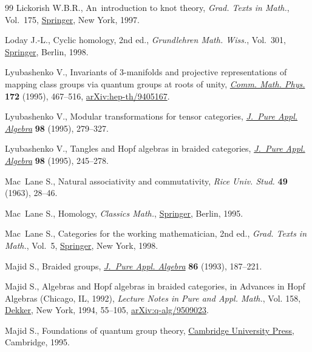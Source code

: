\documentclass[10pt,a4paper]{amsart}
\numberwithin{equation}{section}
\begin{document}
\begin{thebibliography}{99}
Lickorish W.B.R., An~introduction to knot theory, \textit{Grad. Texts in
 Math.}, Vol.~175, \href{https://doi.org/10.1007/978-1-4612-0691-0}{Springer},
 New York, 1997.

Loday J.-L., Cyclic homology, 2nd ed., \textit{Grundlehren Math. Wiss.}, Vol.~301,
 \href{https://doi.org/10.1007/978-3-662-11389-9}{Springer}, Berlin, 1998.

Lyubashenko V., Invariants of {$3$}-manifolds and projective representations of
 mapping class groups via quantum groups at roots of unity,
 \href{https://doi.org/10.1007/BF02101805}{\textit{Comm. Math. Phys.}}
 \textbf{172} (1995), 467--516,
 \href{http://arxiv.org/abs/hep-th/9405167}{arXiv:hep-th/9405167}.

Lyubashenko V., Modular transformations for tensor categories,
 \href{https://doi.org/10.1016/0022-4049(94)00045-K}{\textit{J.~Pure Appl.
 Algebra}} \textbf{98} (1995), 279--327.

Lyubashenko V., Tangles and {H}opf algebras in braided categories,
 \href{https://doi.org/10.1016/0022-4049(95)00044-W}{\textit{J.~Pure Appl.
 Algebra}} \textbf{98} (1995), 245--278.

Mac~Lane S., Natural associativity and commutativity, \textit{Rice Univ. Stud.}
 \textbf{49} (1963), 28--46.

Mac~Lane S., Homology, \textit{Classics Math.},
 \href{https://doi.org/10.1007/978-3-642-62029-4}{Springer}, Berlin, 1995.

Mac~Lane S., Categories for the working mathematician, 2nd ed., \textit{Grad. Texts in
 Math.}, Vol.~5,
 \href{https://doi.org/10.1007/978-1-4757-4721-8}{Springer}, New York, 1998.

Majid S., Braided groups,
 \href{https://doi.org/10.1016/0022-4049(93)90103-Z}{\textit{J.~Pure Appl.
 Algebra}} \textbf{86} (1993), 187--221.

Majid S., Algebras and {H}opf algebras in braided categories, in Advances in
 {H}opf Algebras ({C}hicago, {IL}, 1992), \textit{Lecture Notes in Pure and
 Appl. Math.}, Vol. 158,
 \href{https://doi.org/10.1201/9781003419792-4}{Dekker}, New York, 1994,
 55--105, \href{http://arxiv.org/abs/q-alg/9509023}{arXiv:q-alg/9509023}.

Majid S., Foundations of quantum group theory,
 \href{https://doi.org/10.1017/CBO9780511613104}{Cambridge University Press},
 Cambridge, 1995.


\end{thebibliography}
\end{document}
